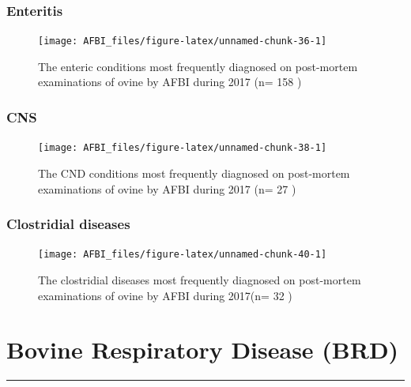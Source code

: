 \documentclass[]{book}
\begin{document}
\subsection{Enteritis}\label{enteritis}

\begin{figure}

{\centering \texttt{[image: AFBI\_files/figure-latex/unnamed-chunk-36-1]} 

}

\caption{The enteric conditions most frequently diagnosed on post-mortem examinations of ovine by AFBI during 2017 (n= 158 )}\label{fig:unnamed-chunk-36}
\end{figure}

\subsection{CNS}\label{cns}

\begin{figure}

{\centering \texttt{[image: AFBI\_files/figure-latex/unnamed-chunk-38-1]} 

}

\caption{The CND conditions most frequently diagnosed on post-mortem examinations of ovine by AFBI during 2017 (n= 27 )}\label{fig:unnamed-chunk-38}
\end{figure}

\subsection{Clostridial diseases}\label{clostridial-diseases}

\begin{figure}

{\centering \texttt{[image: AFBI\_files/figure-latex/unnamed-chunk-40-1]} 

}

\caption{The clostridial diseases most frequently diagnosed on post-mortem examinations of ovine by AFBI during 2017(n= 32 )}\label{fig:unnamed-chunk-40}
\end{figure}

\chapter{Bovine Respiratory Disease
(BRD)}\label{bovine-respiratory-disease-brd}

\begin{center}\rule{0.5\linewidth}{\linethickness}\end{center}
\end{document}
